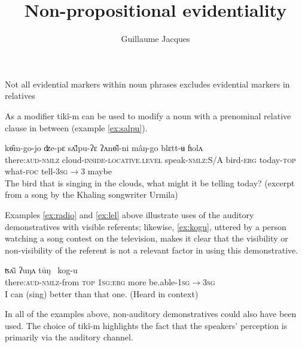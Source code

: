 \documentclass[oldfontcommands,oneside,a4paper,11pt]{article}
\newcommand{\ipa}[1]{{\phon \mbox{#1}}} %
\begin{document}
 
\linenumbers

\title{Non-propositional evidentiality}
\author{Guillaume Jacques}
\maketitle

\citet{launey94}
Not all evidential markers within noun phrases excludes evidential markers in relatives 




As a modifier \ipa{tikî-m} can be used to modify   a noun with a prenominal     relative clause  in between (example \ref{ex:salpu}).

\begin{exe}
\ex \label{ex:salpu}
\gll    	 	\ipa{tikî-m}   	\ipa{kɵ̂m-go-jo}   	\ipa{ʣe-pɛ}   	\ipa{sʌ̄lpu-ʔɛ}   	\ipa{ʔʌnɵ̂l-ni}   	\ipa{mâŋ-go}   	\ipa{blɛtt-ʉ}   	\ipa{ɦolʌ}   
 \\
 there:\textsc{aud}-\textsc{nmlz} cloud-\textsc{inside-locative.level} speak-\textsc{nmlz:}S/A bird-\textsc{erg} today-\textsc{top} what-\textsc{foc} tell-\textsc{3sg$\rightarrow$3} maybe \\
\glt The bird that is singing in the clouds, what might it be telling today? (excerpt from a song by the Khaling songwriter Urmila)
\end{exe}
 

 
Examples \ref{ex:radio} and \ref{ex:lel} above illustrate uses of the auditory demonstratives with visible referents; likewise,   \ref{ex:kogu}, uttered by a person watching a song contest on the television, makes it clear that the visibility or non-visibility of the referent is not a relevant factor in using this demonstrative.

\begin{exe}
\ex \label{ex:kogu}
\gll  	\ipa{tikî-m-kʌ}   	\ipa{ʦʌ̄i} \ipa{ʔuŋʌ} \ipa{tūŋ }   	\ipa{kog-u}   \\
there:\textsc{aud}-\textsc{nmlz}-from \textsc{top} \textsc{1sg:erg} more be.able-\textsc{1sg$\rightarrow$3sg}	  \\
\glt I can (sing) better than that one. (Heard in context)
\end{exe}

 

In all of the examples above, non-auditory demonstratives could also have been used. The choice of \ipa{tikî-m}  highlights the  fact that the  speakers' perception is primarily via the auditory channel.
 
\end{document}
